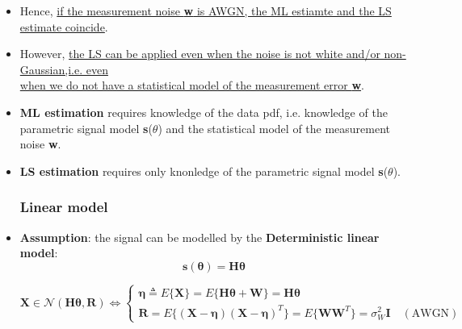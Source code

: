 \begin{itemize}
\[
\hat{\boldsymbol{\theta}}_{ML}
=
\arg\max_{\boldsymbol{\theta}} \ln L(\boldsymbol{\theta})
=
\arg\min_{\boldsymbol{\theta}}
\left\|\mathbf{x} - \mathbf{s}(\boldsymbol{\theta})\right\|^{2}
=
\hat{\boldsymbol{\theta}}_{LS}
\]
\[
\text{AWGN}
\quad \Longrightarrow \quad
\hat{\boldsymbol{\theta}}_{ML}
=
\arg\max_{\boldsymbol{\theta}} \ln f_{\mathbf{X}}(\mathbf{x}; \boldsymbol{\theta})
=
\arg\min_{\boldsymbol{\theta}}
\left\| \mathbf{x} - \mathbf{s}(\boldsymbol{\theta}) \right\|^{2}
=
\hat{\boldsymbol{\theta}}_{LS}
\]
\item Hence, \underline{if the measurement noise \textbf{w} is AWGN, the ML estiamte and the LS estimate coincide}.
\item However, \underline{the LS can be applied even when the noise is not white and/or non-Gaussian,i.e. even}\\ \underline{when we do not have a statistical model of the measurement error \textbf{w}}.
\item \textbf{ML estimation} requires knowledge of the data pdf, i.e. knowledge of the parametric signal model \textbf{s}(\(\theta\)) and the statistical model of the measurement noise \textbf{w}.
\item \textbf{LS estimation} requires only knonledge of the parametric signal model \textbf{s}(\(\theta\)).
\subsubsection{Linear model}
\item \textbf{Assumption}: the signal can be modelled by the \textbf{Deterministic linear model}:
\[
\mathbf{s}(\boldsymbol{\theta}) = \mathbf{H}\boldsymbol{\theta}
\]

\[
\mathbf{X} \in \mathcal{N}(\mathbf{H}\boldsymbol{\theta}, \mathbf{R})
\iff
\begin{cases}
\boldsymbol{\eta} \triangleq E\{\mathbf{X}\}
= E\{\mathbf{H}\boldsymbol{\theta} + \mathbf{W}\}
= \mathbf{H}\boldsymbol{\theta} \\[4pt]
\mathbf{R}
= E\big\{(\mathbf{X} - \boldsymbol{\eta})(\mathbf{X} - \boldsymbol{\eta})^{T}\big\}
= E\{\mathbf{W}\mathbf{W}^{T}\}
= \sigma_W^{2}\mathbf{I} \quad (\text{AWGN})
\end{cases}
\]



\end{itemize}
